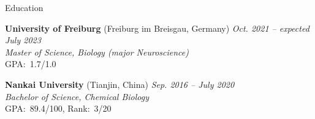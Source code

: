 \begin{rSection}{Education}

    {\bf University of Freiburg} {(Freiburg im Breisgau, Germany)} \hfill {\em Oct. 2021 -- expected July 2023} 
    \\{ \textit {Master of Science, Biology (major Neuroscience)}} 
    \\ { GPA:\ 1.7/1.0}

    {\bf Nankai University} {(Tianjin, China)} \hfill {\em Sep. 2016 -- July 2020} 
    \\ { \textit {Bachelor of Science, Chemical Biology}} \hfill
    \\ { GPA:\ 89.4/100, Rank:\ 3/20} \hfill

\end{rSection}